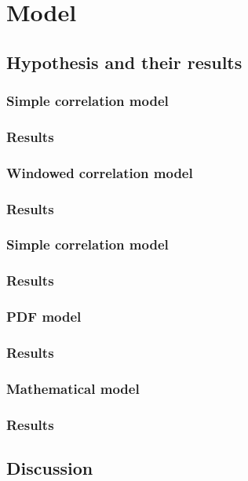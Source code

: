 \chapter{Model}
\label{chap:model}

\section{Hypothesis and their results}

\subsection{Simple correlation model}
\subsection{Results}

\subsection{Windowed correlation model}
\subsection{Results}

\subsection{Simple correlation model}
\subsection{Results}

\subsection{PDF model}
\subsection{Results}

\subsection{Mathematical model}
\subsection{Results}

\section{Discussion}